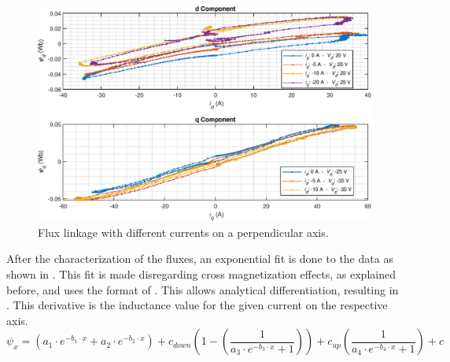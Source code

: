 \begin{figure}[!htb]
	\centering
	\includegraphics[width=1\textwidth]{Figures/all_pulses.eps}
	\caption[Flux linkage with different currents on a perpendicular axis.]{Flux linkage with different currents on a perpendicular axis.}
	\label{fig:all_pulses} %
\end{figure}
After the characterization of the fluxes, an exponential fit is done to the data as shown in . This fit is made disregarding cross magnetization effects, as explained before, and uses the format of . This allows analytical differentiation, resulting in . This derivative is the inductance value for the given current on the respective axis.
\begin{equation}
	\psi_x = ( a_1 \cdot e^{-b_1 \cdot x}+ a_2 \cdot e^{-b_2 \cdot x}) + c_{down}\left(1-\left(\frac{1}{a_3 \cdot e^{-b_3 \cdot x}+1}\right)\right) + c_{up} \left(\frac{1}{a_4 \cdot e^{-b_4 \cdot x}+1}\right) + c
	\label{eq:flux_linkage_fit}
\end{equation}

